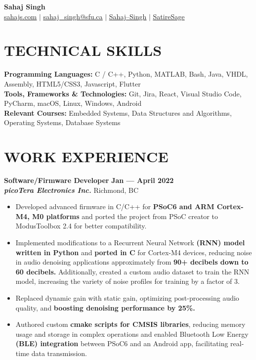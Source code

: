 \documentclass[letterpaper,11pt]{article}
\newcommand{\contact} [5] {
    \begin{center}
        \textbf{\color{colorValue}\Huge #1} \\ \vspace{1pt}
        \small \href{https://#2}{\faIcon{code} \underline{#2}} $|$ \href{mailto:#3}{\faIcon{envelope} \underline{#3}} $|$ 
        \href{#4}{\faIcon{linkedin} \underline{Sahaj--Singh}} $|$
        \href{#5}{\faIcon{github} \underline{SatireSage}}
    \end{center}
}
\newcommand{\Item} [1] {
    \item\small{{#1 \vspace{-2pt}}}
}
\newcommand{\employer} [5] {
    {\textbf{#3} \hfill \textbf{#4 --- #5}\\ \textbf{\emph{#1}} \hfill #2\\}
}
\newcommand{\workItemListStart} [0] {
    \vspace{-1pt}
    \begin{itemize}[topsep=0pt,itemsep=-2pt]
}
\newcommand{\workItemListEnd} [0] {
    \end{itemize}
    \vspace{1pt}
}
\begin{document}
    \vspace*{-30pt}

    \contact{Sahaj Singh}{sahajs.com}{sahaj\_singh@sfu.ca}{https://www.linkedin.com/in/sahaj--singh/}{https://github.com/SatireSage}

    \section{TECHNICAL SKILLS}
    \begin{itemize}[leftmargin=0in, label={}]
    \small{\item{
        \textbf{Programming Languages:}{ C / C++, Python, MATLAB, Bash, Java, VHDL, Assembly, HTML5/CSS3, Javascript, Flutter} \\
        \textbf{Tools, Frameworks \& Technologies:}{ Git, Jira, React, Visual Studio Code, PyCharm, macOS, Linux, Windows, Android} \\
        \textbf{Relevant Courses:}{ Embedded Systems, Data Structures and Algorithms, Operating Systems, Database Systems} \\
    }}
    \end{itemize}

    \section{WORK EXPERIENCE}
    \employer{picoTera Electronics Inc.}{Richmond, BC}{Software/Firmware Developer}{Jan}{April 2022}
    \workItemListStart{}
        \Item{Developed advanced firmware in C/C++ for \textbf{PSoC6 and ARM Cortex-M4, M0 platforms} and ported the project from PSoC creator to ModusToolbox 2.4 for better compatibility.}
        \Item{Implemented modifications to a Recurrent Neural Network \textbf{(RNN) model written in Python} and \textbf{ported in C} for Cortex-M4 devices, reducing noise in audio denoising applications approximately from \textbf{90+ decibels down to 60 decibels.} Additionally, created a custom audio dataset to train the RNN model, increasing the variety of noise profiles for training by a factor of 3.}
        \Item{Replaced dynamic gain with static gain, optimizing post-processing audio quality, and \textbf{boosting denoising performance by 25\%.}}
        \Item{Authored custom \textbf{cmake scripts for CMSIS libraries}, reducing memory usage and storage in complex operations and enabled Bluetooth Low Energy \textbf{(BLE) integration} between PSoC6 and an Android app, facilitating real-time data transmission.}
    \workItemListEnd{}
\end{document}
